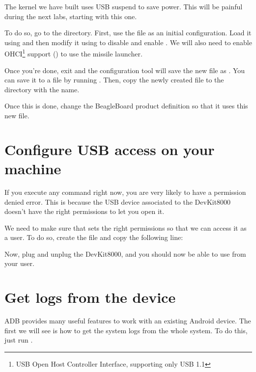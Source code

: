 The kernel we have built uses USB suspend to save power. This will
be painful during the next labs, starting with this one.

To do so, go to the  directory. First, use the
 file as an initial configuration. Load it using
 and then modify it using
 to disable 
and enable . We will also need to enable
OHCI\footnote{USB Open Host Controller Interface, supporting only USB 1.1}
support () to use the missile launcher.

Once you're done, exit and the configuration tool will save the new
file as . You can save it to a  file by
running . Then, copy the newly created
 file to the  directory with
the  name.

Once this is done, change the BeagleBoard product definition so that
it uses this new file.

\section{Configure USB access on your machine}

If you execute any command right now, you are very likely to have a
permission denied error. This is because the USB device associated to
the DevKit8000 doesn't have the right permissions to let you open it.

We need to make sure that  sets the right permissions so that we can access
it as a user. To do so, create the file
 and copy the following line:


Now, plug and unplug the DevKit8000, and you should now be able to use
 from your user.

\section{Get logs from the device}

ADB provides many useful features to work with an existing Android device.
The first we will see is how to get the system logs from the whole system. To do
this, just run .

